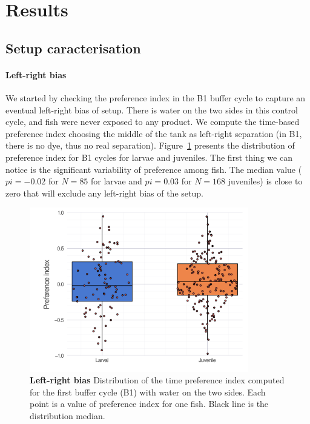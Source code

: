   \section{Results}
  \subsection{Setup caracterisation}
  \paragraph{Left-right bias} We started by checking the preference index in the B1 buffer cycle to capture an eventual left-right bias of setup. There is water on the two sides in this control cycle, and fish were never exposed to any product.  We compute the time-based preference index choosing the middle of the tank as left-right separation (in B1, there is no dye, thus no real separation). Figure~\ref{ld_bias} presents the distribution of preference index for B1 cycles for larvae and juveniles. The first thing we can notice is the significant variability of preference among fish. The median value ($pi = -0.02$ for $N=85$ for larvae and $pi = 0.03$ for $N = 168$ juveniles) is close to zero that will exclude any left-right bias of the setup.

    \begin{figure}[h]
      \centering
      \includegraphics[width=0.85\textwidth]{part_2/assets/ld_bias.png}
      \caption{\textbf{Left-right bias} Distribution of the time preference index computed for the first buffer cycle (B1) with water on the two sides. Each point is a value of preference index for one fish. Black line is the distribution median.}
      \label{ld_bias}
    \end{figure}

